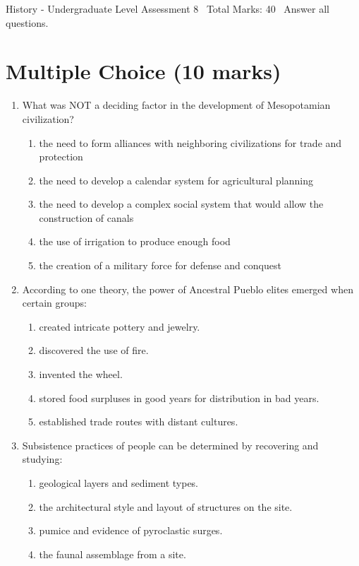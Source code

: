 \documentclass[12pt]{article}
\begin{document}
\begin{center}
History - Undergraduate Level Assessment 8 \
Total Marks: 40 \
Answer all questions.
\end{center}

\section*{Multiple Choice (10 marks)}
\begin{enumerate}[label=\arabic*.]
\item What was NOT a deciding factor in the development of Mesopotamian civilization?
\begin{enumerate}[label=(\alph*)]
    \item the need to form alliances with neighboring civilizations for trade and protection
    \item the need to develop a calendar system for agricultural planning
    \item the need to develop a complex social system that would allow the construction of canals
    \item the use of irrigation to produce enough food
    \item the creation of a military force for defense and conquest
\end{enumerate}
\item According to one theory, the power of Ancestral Pueblo elites emerged when certain groups:
\begin{enumerate}[label=(\alph*)]
    \item created intricate pottery and jewelry.
    \item discovered the use of fire.
    \item invented the wheel.
    \item stored food surpluses in good years for distribution in bad years.
    \item established trade routes with distant cultures.
\end{enumerate}
\item Subsistence practices of people can be determined by recovering and studying:
\begin{enumerate}[label=(\alph*)]
    \item geological layers and sediment types.
    \item the architectural style and layout of structures on the site.
    \item pumice and evidence of pyroclastic surges.
    \item the faunal assemblage from a site.

\end{enumerate}
\end{enumerate}
\end{document}
